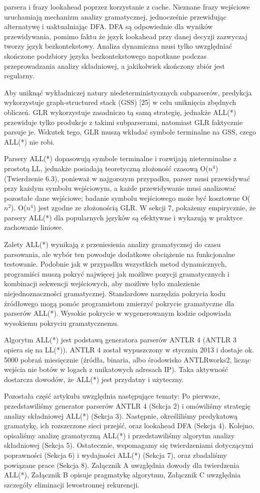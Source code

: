 parsera i frazy lookahead poprzez korzystanie z cache.
Nieznane frazy wejściowe uruchamiają mechanizm analizy gramatycznej,
jednocześnie przewidując alternatywę i uaktualniając DFA.
DFA są odpowiednie dla wyników przewidywania, pomimo faktu że język lookahead
przy danej decyzji zazwyczaj tworzy język bezkontekstowy.
Analiza dynamiczna musi tylko uwzględniać skończone podzbiory języka
bezkontekstowego napotkane podczas przeprowadzania analizy składniowej,
a jakikolwiek skończony zbiór jest regularny.
\par
Aby uniknąć wykładniczej natury niedeterministycznych subparserów,
predykcja wykorzystuje graph-structured stack (GSS) [25] w celu uniknięcia
zbędnych obliczeń.
GLR wykorzystuje zasadniczo tą samą strategię, jednakże ALL(*) przewiduje tylko
produkcje z takimi subparserami, natomiast GLR faktycznie parsuje je.
Wskutek tego, GLR muszą wkładać symbole terminalne na GSS, czego ALL(*) nie robi.
\par
Parsery ALL(*) dopasowują symbole terminalne i rozwijają nieterminalne z
prostotą LL, jednakże posiadają teoretyczną złożoność czasową O($n^4$)
(Twierdzenie 6.3), ponieważ w najgorszym przypadku, parser musi przewidywać
przy każdym symbolu wejściowym, a każde przewidywanie musi analizować pozostałe
dane wejściowe; badanie symbolu wejściowego może być kosztowne O($n^2$).
O($n^4$) jest zgodne ze złożonością GLR.
W sekcji 7, pokażemy empirycznie, że parsery ALL(*) dla popularnych
języków są efektywne i wykazują w praktyce zachowanie liniowe.
\par
Zalety ALL(*) wynikają z przeniesienia analizy gramatycznej do czasu parsowania,
ale wybór ten powoduje dodatkowe obciążenie na funkcjonalne testowanie.
Podobnie jak w przypadku wszystkich metod dynamicznych, programiści muszą
pokryć najwięcej jak możliwe pozycji gramatycznych i kombinacji sekwencji wejściowych,
aby możliwe było znalezienie niejednoznaczności gramatycznej.
Standardowe narzędzia pokrycia kodu źródłowego mogą pomóc programistom zmierzyć
pokrycie gramatyczne dla parserów ALL(*).
Wysokie pokrycie w wygenerowanym kodzie odpowiada wysokiemu pokryciu gramatycznemu.
\par
Algorytm ALL(*) jest podstawą generatora parserów ANTLR 4 (ANTLR 3 opiera się na LL(*)).
ANTLR 4 został wypuszczony w styczniu 2013 i dostaje ok. 5000 pobrań miesięcznie
(źródła, binaria, albo środowisko ANTLRworks2, licząc wejścia nie botów w
logach z unikatowych adresach IP).
Taka aktywność dostarcza dowodów, że ALL(*) jest przydatny i użyteczny.
\par
Pozostała część artykułu uwzględnia następujące tematy: Po pierwsze,
przedstawiliśmy generator parserów ANTLR 4 (Sekcja 2) i omówiliśmy strategię
analizy składniowej ALL(*) (Sekcja 3).
Następnie, określiliśmy predykatową gramatykę, ich rozszerzone sieci przejść,
oraz lookahead DFA (Sekcja 4).
Kolejno, opisaliśmy analizę gramatyczną ALL(*) i przedstawiliśmy algorytm
analizy składniowej (Sekcja 5).
Ostatecznie, wspomagamy się twierdzeniami dotyczącymi poprawności (Sekcja 6)
i wydajności ALL(*) (Sekcja 7), oraz zbadaliśmy powiązane prace (Sekcja 8).
Załącznik A uwzględnia dowody dla twierdzenia ALL(*), Załącznik B opisuje
pragmatykę algorytmu, Załącznik C uwzględnia szczegóły eliminacji lewostronnej rekurencji. 

